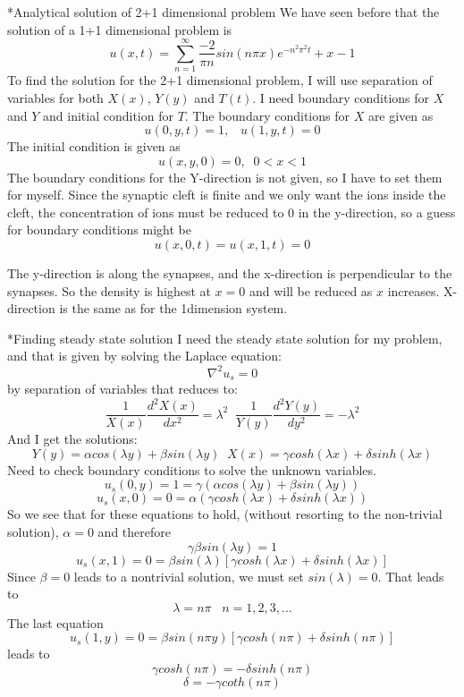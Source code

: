 \documentclass[a4paper, 12pt, titlepage]{article}
\newcommand{\f}[2]{\frac{#1}{#2}}
\newcommand{\beq}{\begin{equation*}}
\newcommand{\eeq}{\end{equation*}}
\newcommand{\beqq}{\begin{equation}}
\newcommand{\eeqq}{\end{equation}}
\begin{document}
\begin{section}
\begin{subsection}
  \end{subsection}

 \end{section}
    
 
 \begin{section}*{Analytical solution of 2+1 dimensional problem} 
  We have seen before that the solution of a 1+1 dimensional problem is 
  \beq u(x,t) = \sum_{n=1}^{\infty} \f{-2}{\pi n} sin(n\pi x) e^{-n^2\pi ^2 t} + x - 1 \eeq
  To find the solution for the 2+1 dimensional problem, I will use separation of variables for both
  $X(x)$, $Y(y)$ and $T(t)$. I need boundary conditions for $X$ and $Y$ and initial condition for $T$.
  The boundary conditions for $X$ are given as \beq u(0,y,t) = 1, \;\;\; u(1,y,t) = 0 \eeq
  The initial condition is given as
  \beq u(x,y,0) = 0, \;\; 0 < x < 1 \eeq
  The boundary conditions for the Y-direction is not given, so I have to set them for myself. Since the 
  synaptic cleft is finite and we only want the ions inside the cleft, the concentration of ions must
  be reduced to 0 in the y-direction, so a guess for boundary conditions might be 
  \beq u(x,0,t) = u(x,1,t) = 0 \eeq
  
  The y-direction is along the synapses, and the x-direction is perpendicular to the synapses. So the 
  density is highest at $x=0$ and will be reduced as $x$ increases. X-direction is the same as for the 
  1dimension system.
  \begin{subsection}*{Finding steady state solution}
  I need the steady state solution for my problem, and that is given by solving the Laplace equation:
  \beq \nabla ^2u_s = 0\eeq
  by separation of variables that reduces to:
  \beq \frac{1}{X(x)} \frac{d ^2 X(x)}{d x^2} = \lambda ^2 \;\; \frac{1}{Y(y)} \frac{d^2Y(y)}{dy^2} = -\lambda ^2\eeq
  And I get the solutions:
  \beq Y(y) = \alpha cos(\lambda y) + \beta sin(\lambda y) \;\; X(x) = \gamma cosh(\lambda x) + \delta sinh(\lambda x) \eeq
  Need to check boundary conditions to solve the unknown variables. 
  \beqq u_s(0,y) = 1 = \gamma(\alpha cos(\lambda y) + \beta sin(\lambda y)) \eeqq
  \beqq u_s(x,0) = 0 = \alpha(\gamma cosh(\lambda x) + \delta sinh(\lambda x)) \eeqq
  So we see that for these equations to hold, (without resorting to the non-trivial solution), $\alpha = 0$ 
  and therefore \beq \gamma \beta sin(\lambda y) = 1 \eeq
  \beqq  u_s(x,1) = 0 = \beta sin(\lambda) [\gamma cosh(\lambda x) + \delta sinh(\lambda x)] \eeqq
  Since $\beta = 0$ leads to a nontrivial solution, we must set $sin(\lambda) = 0$. That leads to 
  \beq \lambda = n\pi \;\;\; n = 1,2,3,... \eeq 
  The last equation 
  \beqq u_s(1,y) = 0 = \beta sin(n\pi y) [\gamma cosh(n\pi) + \delta sinh(n\pi)] \eeqq
  leads to \beq \gamma cosh(n\pi) = -\delta sinh(n\pi) \eeq
  \beq \delta = -\gamma coth(n\pi) \eeq 
  

\end{subsection}
\end{section}
\end{document}
